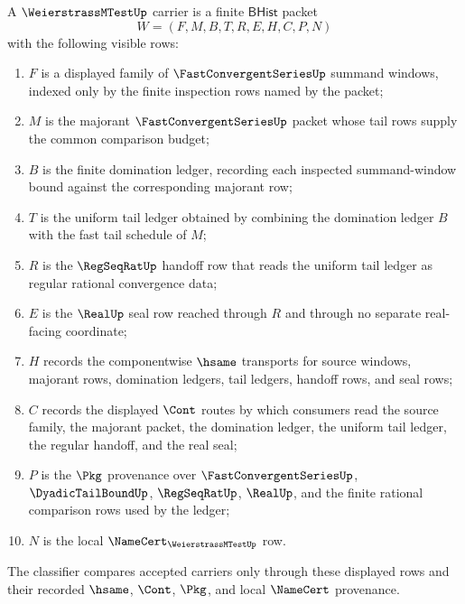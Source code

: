 \begin{definition}
\label{def:weierstrass-mtest-carrier}
A $\WeierstrassMTestUp$ carrier is a finite $\mathsf{BHist}$ packet
$$
W=(F,M,B,T,R,E,H,C,P,N)
$$
with the following visible rows:
\begin{enumerate}
\item $F$ is a displayed family of $\FastConvergentSeriesUp$ summand windows, indexed only by the finite inspection rows named by the packet;
\item $M$ is the majorant $\FastConvergentSeriesUp$ packet whose tail rows supply the common comparison budget;
\item $B$ is the finite domination ledger, recording each inspected summand-window bound against the corresponding majorant row;
\item $T$ is the uniform tail ledger obtained by combining the domination ledger $B$ with the fast tail schedule of $M$;
\item $R$ is the $\RegSeqRatUp$ handoff row that reads the uniform tail ledger as regular rational convergence data;
\item $E$ is the $\RealUp$ seal row reached through $R$ and through no separate real-facing coordinate;
\item $H$ records the componentwise $\hsame$ transports for source windows, majorant rows, domination ledgers, tail ledgers, handoff rows, and seal rows;
\item $C$ records the displayed $\Cont$ routes by which consumers read the source family, the majorant packet, the domination ledger, the uniform tail ledger, the regular handoff, and the real seal;
\item $P$ is the $\Pkg$ provenance over $\FastConvergentSeriesUp$, $\DyadicTailBoundUp$, $\RegSeqRatUp$, $\RealUp$, and the finite rational comparison rows used by the ledger;
\item $N$ is the local $\NameCert_{\WeierstrassMTestUp}$ row.
\end{enumerate}
The classifier compares accepted carriers only through these displayed rows and their recorded $\hsame$, $\Cont$, $\Pkg$, and local $\NameCert$ provenance.
\end{definition}


